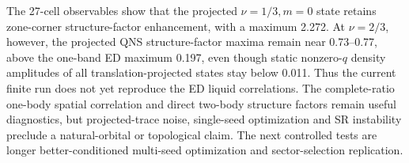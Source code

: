 The 27-cell observables show that the projected $\nu=1/3,m=0$ state retains
zone-corner structure-factor enhancement, with a maximum 2.272. At
$\nu=2/3$, however, the projected QNS structure-factor maxima remain near
0.73--0.77, above the one-band ED
maximum 0.197, even though static nonzero-$q$ density amplitudes of all
translation-projected states stay below 0.011. Thus the current finite run
does not yet reproduce the ED liquid correlations. The complete-ratio
one-body spatial correlation and direct two-body structure factors remain
useful diagnostics,
but projected-trace noise, single-seed optimization and SR instability preclude
a natural-orbital or topological claim. The next controlled tests are longer
better-conditioned multi-seed optimization and sector-selection replication.
